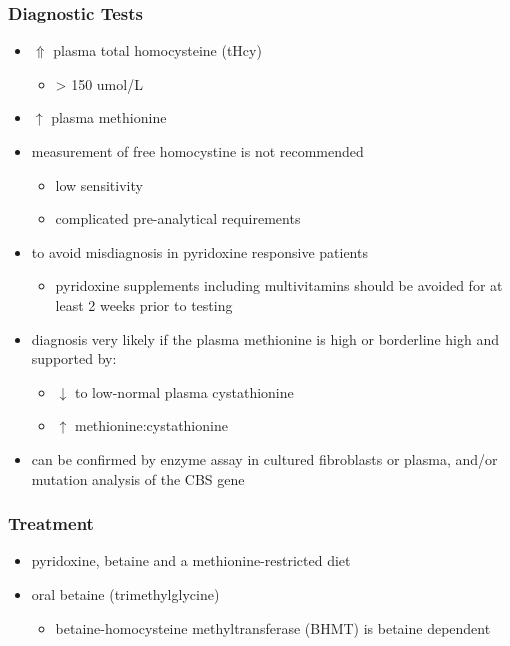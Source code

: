 \documentclass[12pt]{scrartcl}
\begin{document}
\begin{center}
\begin{center}
\subsubsection{Diagnostic Tests}
\label{sec:org1c4dfd3}
\begin{itemize}
\item \(\Uparrow\) plasma total homocysteine (tHcy)
\begin{itemize}
\item \textgreater{} 150 umol/L
\end{itemize}
\item \(\uparrow\) plasma methionine
\item measurement of free homocystine is not recommended
\begin{itemize}
\item low sensitivity
\item complicated pre-analytical requirements
\end{itemize}
\item to avoid misdiagnosis in pyridoxine responsive patients
\begin{itemize}
\item pyridoxine supplements including multivitamins should be avoided
for at least 2 weeks prior to testing
\end{itemize}
\item diagnosis very likely if the plasma methionine is high or borderline
high and supported by:
\begin{itemize}
\item \(\downarrow\) to low-normal plasma cystathionine
\item \(\uparrow\) methionine:cystathionine
\end{itemize}
\item can be confirmed by enzyme assay in cultured fibroblasts or plasma,
and/or mutation analysis of the CBS gene
\end{itemize}

\subsubsection{Treatment}
\label{sec:orgf7a2a9d}
\begin{itemize}
\item pyridoxine, betaine and a methionine-restricted diet
\item oral betaine (trimethylglycine)
\begin{itemize}
\item betaine-homocysteine methyltransferase (BHMT) is betaine dependent
\end{itemize}
\end{itemize}


\end{center}
\end{center}
\end{document}
